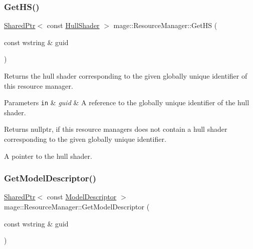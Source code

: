 \subsubsection{\texorpdfstring{Get\+H\+S()}{GetHS()}}
{\footnotesize\ttfamily \hyperlink{namespacemage_a1e01ae66713838a7a67d30e44c67703e}{Shared\+Ptr}$<$ const \hyperlink{namespacemage_a6705043f61391313d099f89ee3cc94ee}{Hull\+Shader} $>$ mage\+::\+Resource\+Manager\+::\+Get\+HS (\begin{DoxyParamCaption}\item[{const wstring \&}]{guid }\end{DoxyParamCaption})\hspace{0.3cm}{\ttfamily [noexcept]}}

Returns the hull shader corresponding to the given globally unique identifier of this resource manager.


\begin{DoxyParams}[1]{Parameters}
\mbox{\tt in}  & {\em guid} & A reference to the globally unique identifier of the hull shader. \\
\hline
\end{DoxyParams}
\begin{DoxyReturn}{Returns}
{\ttfamily nullptr}, if this resource managers does not contain a hull shader corresponding to the given globally unique identifier. 

A pointer to the hull shader. 
\end{DoxyReturn}
\hypertarget{classmage_1_1_resource_manager_a311d328f5a7cbb82da84815ee195c06f}{}\label{classmage_1_1_resource_manager_a311d328f5a7cbb82da84815ee195c06f} 
\subsubsection{\texorpdfstring{Get\+Model\+Descriptor()}{GetModelDescriptor()}}
{\footnotesize\ttfamily \hyperlink{namespacemage_a1e01ae66713838a7a67d30e44c67703e}{Shared\+Ptr}$<$ const \hyperlink{classmage_1_1_model_descriptor}{Model\+Descriptor} $>$ mage\+::\+Resource\+Manager\+::\+Get\+Model\+Descriptor (\begin{DoxyParamCaption}\item[{const wstring \&}]{guid }\end{DoxyParamCaption})\hspace{0.3cm}{\ttfamily [noexcept]}}

